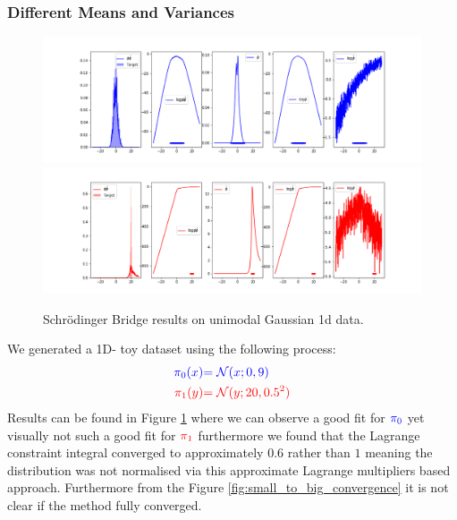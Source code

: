 \documentclass[a4paper,12pt,twoside,openright]{report}
\theoremstyle{definition}
\begin{document}
\subsubsection{Different Means and Variances}
\begin{figure}
    \centering
    \includegraphics[scale=0.42,trim={2.3cm 0.2cm 1.5cm 0}, clip]{images/Pavon/Forward_bigvar_test_working.png}\\\vspace{-0.2cm}
    \includegraphics[scale=0.42,trim={2.3cm 0 1.5cm 1.5cm}, clip]{images/Pavon/Backward_bigvar_test_working.png} 
    \caption{Schrödinger Bridge results on unimodal Gaussian 1d data. }
    \label{fig:small_to_big}
\end{figure}
We generated a 1D- toy dataset using the following process:
\begin{align*}
     \color{blue}{\pi_0(x)} &\color{blue}{= {\mathcal{N}}(x; 0,  9)} \\
    \color{red}{\pi_1(y)} &\color{red}{= {\mathcal{N}}(y; 20, 0.5 ^2)} 
\end{align*}
Results can be found in Figure \ref{fig:small_to_big} where we can observe a good fit for $\color{blue}{\pi_0}$ yet visually not such a good fit for $\color{red}{\pi_1}$ furthermore we found that the Lagrange constraint integral converged to approximately $0.6$ rather than $1$ meaning the distribution was not normalised via this approximate Lagrange multipliers based approach. Furthermore from the Figure \ref{fig:small_to_big_convergence} it is not clear if the method fully converged. 
\end{document}
